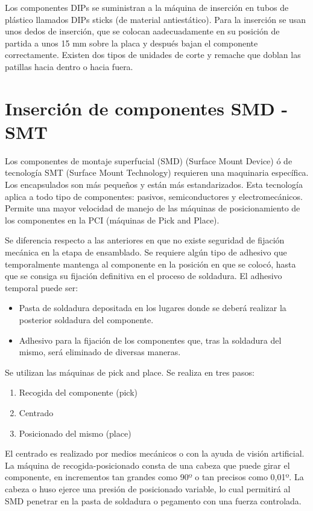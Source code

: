 Los componentes DIPs se suministran a la máquina de inserción en tubos de plástico llamados DIPs sticks (de material antiestático). Para la inserción se usan unos dedos de inserción, que se colocan aadecuadamente en su posición de partida a unos 15 mm sobre la placa y después bajan el componente correctamente. Existen dos tipos de unidades de corte y remache que doblan las patillas hacia dentro o hacia fuera.


\section{Inserción de componentes SMD - SMT}
Los componentes de montaje superfucial (SMD) (Surface Mount Device) ó de tecnología SMT (Surface Mount Technology) requieren una maquinaria específica. Los encapsulados son más pequeños y están más estandarizados. Esta tecnología aplica a todo tipo de componentes: pasivos, semiconductores y electromecánicos. Permite una mayor velocidad de manejo de las máquinas de posicionamiento de los componentes en la PCI (máquinas de Pick and Place).

Se diferencia respecto a las anteriores en que no existe seguridad de fijación mecánica en la etapa de ensamblado. Se requiere algún tipo de adhesivo que temporalmente mantenga al componente en la posición en que se colocó, hasta que se consiga su fijación definitiva en el proceso de soldadura. El adhesivo temporal puede ser:
\begin{itemize}
    \item Pasta de soldadura depositada en los lugares donde se deberá realizar la posterior soldadura del componente.
    \item Adhesivo para la fijación de los componentes que, tras la soldadura del mismo, será eliminado de diversas maneras.
\end{itemize}

Se utilizan las máquinas de pick and place. Se realiza en tres pasos: 
\begin{enumerate}
    \item Recogida del componente (pick)
    \item Centrado
    \item Posicionado del mismo (place)
\end{enumerate}

El centrado es realizado por medios mecánicos o con la ayuda de visión artificial. La máquina de recogida-posicionado consta de una cabeza que puede girar el componente, en incrementos tan grandes como 90º o tan precisos como 0,01º. La cabeza o huso ejerce una presión de posicionado variable, lo cual permitirá al SMD penetrar en la pasta de soldadura o pegamento con una fuerza controlada.

